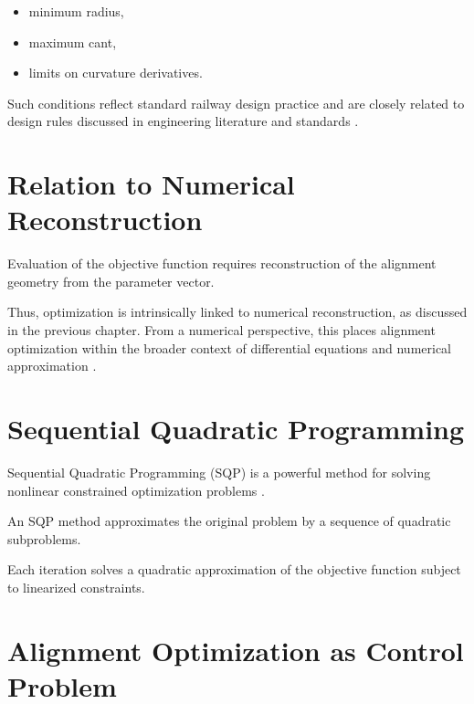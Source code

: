 \begin{itemize}
\item minimum radius,
\item maximum cant,
\item limits on curvature derivatives.
\end{itemize}

Such conditions reflect standard railway design practice and are closely
related to design rules discussed in engineering literature and
standards \cite{Klein1998Trassierung,EN13803_2017}.


\section{Relation to Numerical Reconstruction}

Evaluation of the objective function requires reconstruction of the
alignment geometry from the parameter vector.

Thus, optimization is intrinsically linked to numerical reconstruction,
as discussed in the previous chapter. From a numerical perspective, this
places alignment optimization within the broader context of differential
equations and numerical approximation
\cite{Hairer1993ODE,Press2007NumericalRecipes}.

\section{Sequential Quadratic Programming}

Sequential Quadratic Programming (SQP) is a powerful method for solving
nonlinear constrained optimization problems
\cite{Nocedal2006NumericalOptimization}.

\begin{definition}
An SQP method approximates the original problem by a sequence of
quadratic subproblems.
\end{definition}

Each iteration solves a quadratic approximation of the objective
function subject to linearized constraints.



\section{Alignment Optimization as Control Problem}

